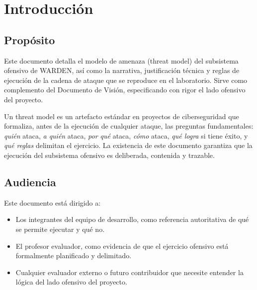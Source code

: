 \documentclass[11pt,a4paper]{article}
\begin{document}

\begin{wardenrevisions}
\end{wardenrevisions}

\tableofcontents
\newpage

\section{Introducción}

\subsection{Propósito}
Este documento detalla el modelo de amenaza (threat model) del subsistema
ofensivo de WARDEN, así como la narrativa, justificación técnica y reglas de
ejecución de la cadena de ataque que se reproduce en el laboratorio. Sirve
como complemento del Documento de Visión, especificando con rigor el lado
ofensivo del proyecto.

Un threat model es un artefacto estándar en proyectos de ciberseguridad que
formaliza, antes de la ejecución de cualquier ataque, las preguntas
fundamentales: \emph{quién} ataca, \emph{a quién} ataca, \emph{por qué} ataca,
\emph{cómo} ataca, \emph{qué logra} si tiene éxito, y \emph{qué reglas}
delimitan el ejercicio. La existencia de este documento garantiza que la
ejecución del subsistema ofensivo es deliberada, contenida y trazable.

\subsection{Audiencia}
Este documento está dirigido a:

\begin{itemize}
  \item Los integrantes del equipo de desarrollo, como referencia
    autoritativa de qué se permite ejecutar y qué no.
  \item El profesor evaluador, como evidencia de que el ejercicio ofensivo
    está formalmente planificado y delimitado.
  \item Cualquier evaluador externo o futuro contribuidor que necesite
    entender la lógica del lado ofensivo del proyecto.
\end{itemize}
\end{document}
